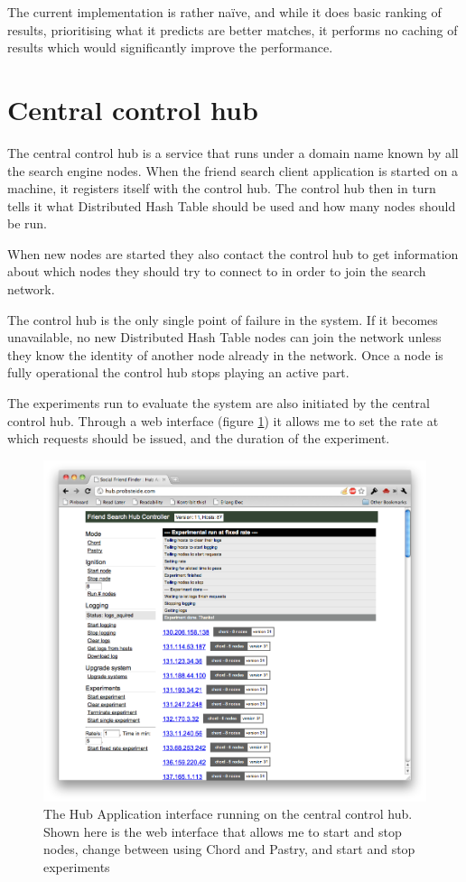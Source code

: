 The current implementation is rather na\"ive, and while it does basic ranking of results, prioritising what it predicts are better matches, it performs no caching of results which would significantly improve the performance.

\section{Central control hub}
The central control hub is a service that runs under a domain name known by all the search engine nodes.
When the friend search client application is started on a machine, it registers itself with the control hub. The control hub then in turn tells it what Distributed Hash Table should be used and how many nodes should be run.

When new nodes are started they also contact the control hub to get information about which nodes they should try to connect to in order to join the search network.

The control hub is the only single point of failure in the system. If it becomes unavailable, no new Distributed Hash Table nodes can join the network unless they know the identity of another node already in the network. Once a node is fully operational the control hub stops playing an active part.

The experiments run to evaluate the system are also initiated by the central control hub.
Through a web interface (figure \ref{figHubApp}) it allows me to set the rate at which requests should be issued, and the duration of the experiment.

\begin{figure}[!htb]
\begin{center}
	\includegraphics[width=0.9\linewidth]{illustrations/HubApp.png}
\caption{The Hub Application interface running on the central control hub. Shown here is the web interface that allows me to start and stop nodes, change between using Chord and Pastry, and start and stop experiments}
\label{figHubApp}
\end{center}
\end{figure}

